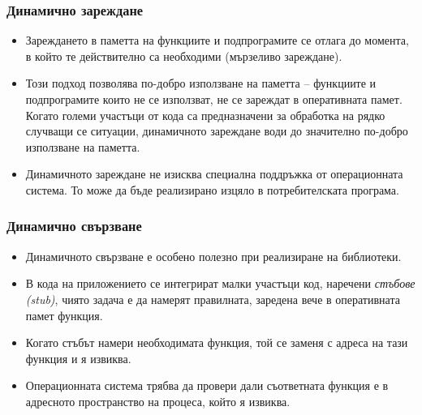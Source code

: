 \documentclass[ignorenonframetext, hyperref=unicode]{beamer}
\begin{document}
\begin{frame}
\frametitle{Динамично зареждане}
\begin{itemize}
  \item Зареждането в паметта на функциите и подпрограмите се отлага до
  момента, в който те действително са необходими (мързеливо зареждане).
  \item Този подход позволява по-добро използване на паметта -- функциите и
  подпрограмите които не се използват, не се зареждат в оперативната памет.
  Когато големи участъци от кода са предназначени за обработка на рядко
  случващи се ситуации, динамичното зареждане води до значително по-добро
  използване на паметта.
  \item Динамичното зареждане не изисква специална поддръжка от операционната
  система. То може да бъде реализирано изцяло в потребителската програма.
\end{itemize}
\end{frame}

\begin{frame}
\frametitle{Динамично свързване}
\begin{itemize}
  \item Динамичното свързване е особено полезно при реализиране на библиотеки.
  \item В кода на приложението се интегрират малки участъци код, наречени {\em
  стъбове (stub)}, чиято задача е да намерят правилната, заредена вече в
  оперативната памет функция.
  \item Когато стъбът намери необходимата функция, той се заменя с адреса на
  тази функция и я извиква.
  \item Операционната система трябва да провери дали съответната функция е в
  адресното пространство на процеса, който я извиква.
\end{itemize}
\end{frame}
\end{document}
